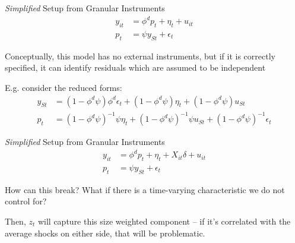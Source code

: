 \documentclass[notes,11pt, aspectratio=169]{beamer}
\newenvironment{wideitemize}{\itemize\addtolength{\itemsep}{10pt}}{\enditemize}
\begin{document}
\begin{frame}{\emph{Simplified} Setup from Granular Instruments}
    \begin{align}
      y_{it} &= \phi^{d}p_{t} + \eta_{t} + u_{it}\\
      p_{t}  &= \psi y_{St} + \epsilon_{t}
    \end{align}
  
    \begin{wideitemize}
    \item Conceptually, this model has no external instruments, but if
      it is correctly specified, it can identify residuals which are
      assumed to be independent
    \item E.g. consider the reduced forms:
      \begin{align}
        y_{St} &=  (1-\phi^{d} \psi)  \phi^{d}  \epsilon_{t} + (1-\phi^{d} \psi)\eta_t + (1-\phi^{d} \psi)u_{St}\\
        p_t &= (1- \phi^{d}\psi)^{-1}\psi \eta_{t} + (1- \phi^{d}\psi)^{-1} \psi u_{St} + (1- \phi^{d}\psi)^{-1} \epsilon_{t}
      \end{align}
  \end{wideitemize}
\end{frame}
\begin{frame}{\emph{Simplified} Setup from Granular Instruments}
    \begin{align}
      y_{it} &= \phi^{d}p_{t} + \eta_{t} + X_{it}\delta + u_{it}\\
      p_{t}  &= \psi y_{St} + \epsilon_{t}
    \end{align}
  
    \begin{wideitemize}
    \item How can this break? What if there is a time-varying characteristic we do not control for?
    \item Then, $z_{t}$ will capture this size weighted component --
      if it's correlated with the average shocks on either side, that
      will be problematic.
  \end{wideitemize}
\end{frame}
\end{document}
